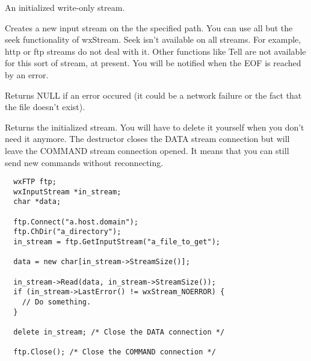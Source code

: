 
An initialized write-only stream.




\label{wxftpgetinput}


Creates a new input stream on the the specified path. You can use all but the seek
functionality of wxStream. Seek isn't available on all streams. For example,
http or ftp streams do not deal with it. Other functions like Tell
are not available for this sort of stream, at present.
You will be notified when the EOF is reached by an error.


Returns NULL if an error occured (it could be a network failure or the fact
that the file doesn't exist).

Returns the initialized stream. You will have to delete it yourself when you
don't need it anymore. The destructor closes the DATA stream connection but
will leave the COMMAND stream connection opened. It means that you can still
send new commands without reconnecting.


\begin{verbatim}
  wxFTP ftp;
  wxInputStream *in_stream;
  char *data;

  ftp.Connect("a.host.domain");
  ftp.ChDir("a_directory");
  in_stream = ftp.GetInputStream("a_file_to_get");

  data = new char[in_stream->StreamSize()];

  in_stream->Read(data, in_stream->StreamSize());
  if (in_stream->LastError() != wxStream_NOERROR) {
    // Do something.
  }

  delete in_stream; /* Close the DATA connection */

  ftp.Close(); /* Close the COMMAND connection */
\end{verbatim}




